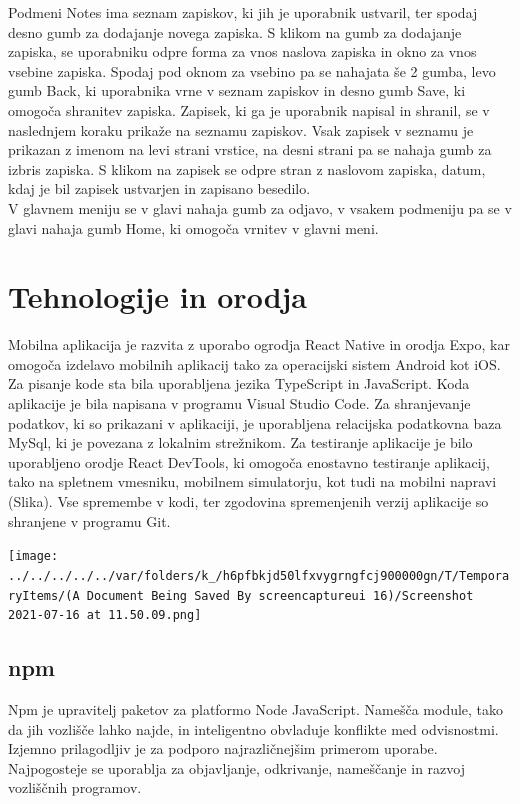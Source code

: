 \documentclass[a4paper, 12pt]{book}
\begin{document}
Podmeni Notes ima seznam zapiskov, ki jih je uporabnik ustvaril, ter spodaj desno gumb za dodajanje novega zapiska. S klikom na gumb za dodajanje zapiska, se uporabniku odpre forma za vnos naslova zapiska in okno za vnos vsebine zapiska. Spodaj pod oknom za vsebino pa se nahajata še 2 gumba, levo gumb Back, ki uporabnika vrne v seznam zapiskov in desno gumb Save, ki omogoča shranitev zapiska. Zapisek, ki ga je uporabnik napisal in shranil, se v naslednjem koraku prikaže na seznamu zapiskov. Vsak zapisek v seznamu je prikazan z imenom na levi strani vrstice, na desni strani pa se nahaja gumb za izbris zapiska.
S klikom na zapisek se odpre stran z naslovom zapiska, datum, kdaj je bil zapisek ustvarjen in zapisano besedilo. \\
 
V glavnem meniju se v glavi nahaja gumb za odjavo, v vsakem podmeniju pa se v glavi nahaja gumb Home, ki omogoča vrnitev v glavni meni. 


\chapter{Tehnologije in orodja}
\label{ch2}

Mobilna aplikacija je razvita z uporabo ogrodja React Native in orodja Expo, kar omogoča izdelavo mobilnih aplikacij tako za operacijski sistem Android kot iOS. Za pisanje kode sta bila uporabljena jezika TypeScript in JavaScript. Koda aplikacije je bila napisana v programu Visual Studio Code. Za shranjevanje podatkov, ki so prikazani v aplikaciji, je uporabljena relacijska podatkovna baza MySql, ki je povezana z lokalnim strežnikom. 
Za testiranje aplikacije je bilo uporabljeno orodje React DevTools, ki omogoča enostavno testiranje aplikacij, tako na spletnem vmesniku, mobilnem simulatorju, kot tudi na mobilni napravi (Slika). Vse spremembe v kodi, ter zgodovina spremenjenih verzij aplikacije so shranjene v programu Git.

\texttt{[image: ../../../../../var/folders/k\_/h6pfbkjd50lfxvygrngfcj900000gn/T/TemporaryItems/(A Document Being Saved By screencaptureui 16)/Screenshot 2021-07-16 at 11.50.09.png]} 

\section{npm}
Npm je upravitelj paketov za platformo Node JavaScript. Namešča module, tako da jih vozlišče lahko najde, in inteligentno obvladuje konflikte med odvisnostmi. Izjemno prilagodljiv je za podporo najrazličnejšim primerom uporabe. Najpogosteje se uporablja za objavljanje, odkrivanje, nameščanje in razvoj vozliščnih programov.~\cite{npm}
\end{document}
